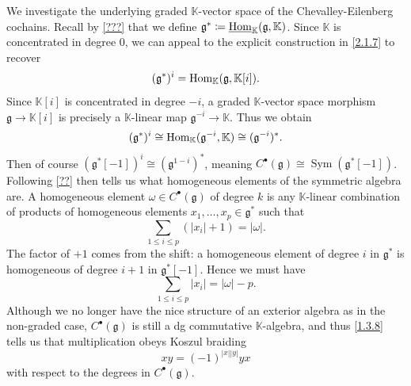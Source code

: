 \begin{discussion}\label{3.2.3}
	We investigate the underlying graded $\mathbb{K} $-vector space of the Chevalley-Eilenberg cochains. Recall by \cref{???} that we define $\mathfrak{g} ^* \coloneqq \underline{\operatorname{Hom}}_\mathbb{K} (\mathfrak{g} ,\mathbb{K} )$. Since $\mathbb{K} $ is concentrated in degree 0, we can appeal to the explicit construction in \cref{2.1.7} to recover
	\[
		(\mathfrak{g} ^*)^i = \operatorname{Hom}_\mathbb{K} (\mathfrak{g} , \mathbb{K} [i]) 
	.\]
	Since $\mathbb{K} [i]$ is concentrated in degree $-i$, a graded $\mathbb{K} $-vector space morphism $\mathfrak{g} \to \mathbb{K} [i]$ is precisely a $\mathbb{K} $-linear map $\mathfrak{g} ^{-i} \to \mathbb{K} $. Thus we obtain
	\[
		(\mathfrak{g} ^*)^i \cong \operatorname{Hom}_\mathbb{K} (\mathfrak{g} ^{-i} , \mathbb{K} ) \cong (\mathfrak{g} ^{-i} )^*
	.\]
	Then of course $(\mathfrak{g} ^*[-1])^i \cong (\mathfrak{g}^{1-i} )^*$, meaning $C^{\bullet} (\mathfrak{g} )\cong \operatorname{Sym} (\mathfrak{g} ^*[-1])$. Following \cref{??} then tells us what homogeneous elements of the symmetric algebra are. A homogeneous element $\omega \in C^{\bullet} (\mathfrak{g} )$ of degree $k$ is any $\mathbb{K} $-linear combination of products of homogeneous elements $x_1, \ldots ,x_p\in \mathfrak{g} ^*$ such that
	\[
		\sum_{1\leq i\leq p} (\left| x_i\right| + 1) =\left| \omega  \right| 
	.\]
	The factor of $+1$ comes from the shift: a homogeneous element of degree $i$ in $\mathfrak{g} ^*$ is homogeneous of degree $i+1$ in $\mathfrak{g} ^*[-1]$. Hence we must have
	\[
		\sum_{1\leq i\leq p} \left| x_i \right| =\left| \omega  \right| -p
	.\]
	Although we no longer have the nice structure of an exterior algebra as in the non-graded case, $C^{\bullet} (\mathfrak{g} )$ is still a dg commutative $\mathbb{K} $-algebra, and thus \cref{1.3.8} tells us that multiplication obeys Koszul braiding
	\[
		xy=(-1)^{\left| x \right| \left| y \right| } yx
	\]
	with respect to the degrees in $C^{\bullet} (\mathfrak{g} )$.
\end{discussion}

